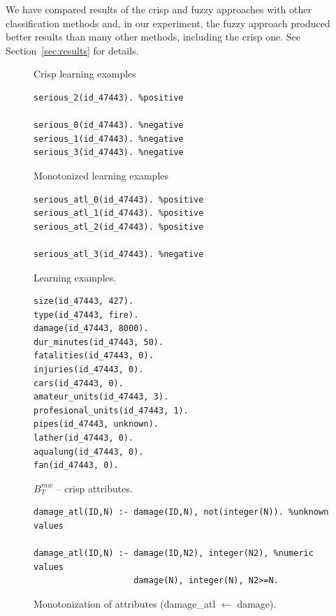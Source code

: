 We have compared results of the crisp and fuzzy approaches with other classification methods and, in our experiment, the fuzzy approach produced better results than many other methods, including the crisp one. See Section~\ref{sec:results} for details.



\begin{figure}
\begin{minipage}[b]{0.5\hsize}
	Crisp learning examples\\
\begin{verbatim}
serious_2(id_47443). %positive

serious_0(id_47443). %negative
serious_1(id_47443). %negative
serious_3(id_47443). %negative							
\end{verbatim}						
	Monotonized learning examples\\
\begin{verbatim}
serious_atl_0(id_47443). %positive
serious_atl_1(id_47443). %positive
serious_atl_2(id_47443). %positive

serious_atl_3(id_47443). %negative					
\end{verbatim}						
	\caption{Learning examples.}
	\label{img:examples}
\end{minipage}
\hspace{0.5cm}
\begin{minipage}[b]{0.5\hsize}
\begin{verbatim}
size(id_47443, 427).
type(id_47443, fire).
damage(id_47443, 8000).
dur_minutes(id_47443, 50).
fatalities(id_47443, 0).
injuries(id_47443, 0).
cars(id_47443, 0).
amateur_units(id_47443, 3).
profesional_units(id_47443, 1).
pipes(id_47443, unknown).
lather(id_47443, 0).
aqualung(id_47443, 0).
fan(id_47443, 0).
\end{verbatim}						
	\caption{$B^{raw}_{T}$ -- crisp attributes.}
	\label{img:crisp_attributes}
\end{minipage}
\end{figure}

\begin{figure}[htb]	
\begin{verbatim}
damage_atl(ID,N) :- damage(ID,N), not(integer(N)). %unknown values

damage_atl(ID,N) :- damage(ID,N2), integer(N2), %numeric values
                    damage(N), integer(N), N2>=N.
\end{verbatim}						
	\caption{Monotonization of attributes (damage\_atl $\leftarrow$ damage).}
	\label{img:attribute_monotonization}
\end{figure}

